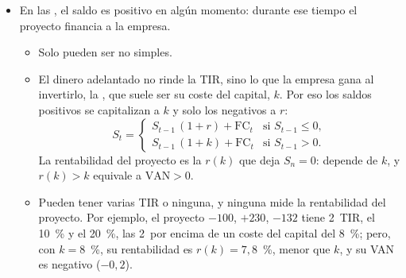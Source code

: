 \documentclass[11pt]{article}
\begin{document}
\begin{itemize}
\begin{itemize}
\begin{itemize}
\begin{itemize}
      \item Tienen una sola TIR, que mide de verdad la rentabilidad del proyecto.
      \end{itemize}
    \item En las , el saldo es positivo en algún momento: durante ese tiempo el proyecto financia a la empresa.
      \begin{itemize}
      \item Solo pueden ser no simples.
      \item El dinero adelantado no rinde la TIR, sino lo que la empresa gana al invertirlo, la , que suele ser su coste del capital, $k$. Por eso los saldos positivos se capitalizan a $k$ y solo los negativos a $r$:
        \[
        S_t=\begin{cases}S_{t-1}\,(1+r)+\mathrm{FC}_t & \text{si } S_{t-1}\leq 0,\\ S_{t-1}\,(1+k)+\mathrm{FC}_t & \text{si } S_{t-1}>0.\end{cases}
        \]
        La rentabilidad del proyecto es la $r(k)$ que deja $S_n=0$: depende de $k$, y $r(k)>k$ equivale a $\mathrm{VAN}>0$.
      \item Pueden tener varias TIR o ninguna, y ninguna mide la rentabilidad del proyecto. Por ejemplo, el proyecto $-100$, $+230$, $-132$ tiene 2~TIR, el 10~\% y el 20~\%, las 2~por encima de un coste del capital del 8~\%; pero, con $k=8$~\%, su rentabilidad es $r(k)=7{,}8$~\%, menor que $k$, y su VAN es negativo ($-0{,}2$).
      \end{itemize}
    \end{itemize}
  \end{itemize}
\end{itemize}

\begin{infografia}[H]
\centering
\caption{Clasificación de las inversiones: la TIR y el punto de }\label{figu:clasificacion-inversiones}
\end{infografia}
\end{document}
